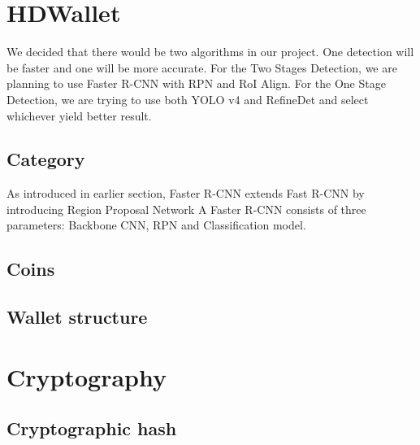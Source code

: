 \section{HDWallet}
We decided that there would be two algorithms in our project. One detection will be faster and one will be more accurate. For the Two Stages Detection, we are planning to use Faster R-CNN with RPN and RoI Align. For the One Stage Detection, we are trying to use both YOLO v4 and RefineDet and select whichever yield better result.
\subsection{Category}
As introduced in earlier section, Faster R-CNN extends Fast R-CNN by introducing Region Proposal Network
A Faster R-CNN consists of three parameters: Backbone CNN, RPN and Classification model.
\subsection{Coins}

\subsection{Wallet structure}

\section{Cryptography}

\subsection{Cryptographic hash}

